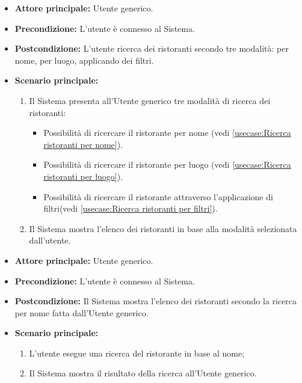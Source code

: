 \label{usecase:Ricerca di ristoranti}
\begin{itemize}
	\item \textbf{Attore principale:} Utente generico.

	\item \textbf{Precondizione:}
	      L'utente è connesso al Sistema.

	\item \textbf{Postcondizione:} L'utente ricerca dei ristoranti secondo tre modalità: per nome, per luogo, applicando dei filtri.

	\item \textbf{Scenario principale:}
	      \begin{enumerate}
              \item Il Sistema presenta all'Utente generico tre modalità di ricerca dei ristoranti:
		      \begin{itemize}
                \item Possibilità di ricercare il ristorante per nome (vedi \autoref{usecase:Ricerca ristoranti per nome}).
                \item Possibilità di ricercare il ristorante per luogo (vedi \autoref{usecase:Ricerca ristoranti per luogo}).
                \item Possibilità di ricercare il ristorante attraverso l'applicazione di filtri(vedi \autoref{usecase:Ricerca ristoranti per filtri}).
              \end{itemize}

		      \item Il Sistema mostra l'elenco dei ristoranti in base alla modalità selezionata dall'utente.
		    
	      \end{enumerate}
\end{itemize}


\label{usecase:Ricerca ristoranti per nome}
\begin{itemize}
	\item \textbf{Attore principale:} Utente generico.
	
	\item \textbf{Precondizione:} L'utente è connesso al Sistema.

	\item \textbf{Postcondizione:} Il Sistema mostra l'elenco dei ristoranti secondo la ricerca per nome fatta dall'Utente generico.
	      
	\item \textbf{Scenario principale:}
	      \begin{enumerate}
		      \item L'utente esegue una ricerca del ristorante in base al nome;
		      \item Il Sistema mostra il risultato della ricerca all'Utente generico.
	      \end{enumerate}
\end{itemize}

